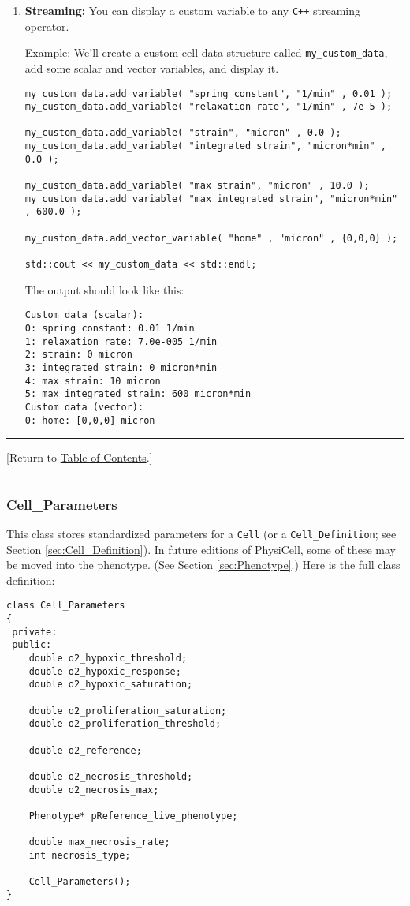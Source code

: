 \documentclass[12pt]{article}
\renewcommand{\v}{\verb}
\newcommand{\TOClink}{\begin{center}\hrule\vskip-5pt\phantom{.}\hfill[Return to \hyperlink{TOC}{Table of Contents}.]\hfill\phantom{.}\vskip3pt\hrule\end{center}}
\begin{document}
\begin{enumerate}
\item 
\textbf{Streaming:} You can display a custom variable to any 
\v|C++| streaming operator. 

\underline{Example:} We'll create a custom cell data structure called \v|my_custom_data|, 
add some scalar and vector variables, and display it. 
\begin{verbatim}
my_custom_data.add_variable( "spring constant", "1/min" , 0.01 ); 
my_custom_data.add_variable( "relaxation rate", "1/min" , 7e-5 ); 

my_custom_data.add_variable( "strain", "micron" , 0.0 ); 
my_custom_data.add_variable( "integrated strain", "micron*min" , 0.0 ); 

my_custom_data.add_variable( "max strain", "micron" , 10.0 ); 
my_custom_data.add_variable( "max integrated strain", "micron*min" , 600.0 ); 

my_custom_data.add_vector_variable( "home" , "micron" , {0,0,0} ); 

std::cout << my_custom_data << std::endl; 
\end{verbatim}

The output should look like this: 

\begin{verbatim}
Custom data (scalar):
0: spring constant: 0.01 1/min
1: relaxation rate: 7.0e-005 1/min
2: strain: 0 micron
3: integrated strain: 0 micron*min
4: max strain: 10 micron
5: max integrated strain: 600 micron*min
Custom data (vector):
0: home: [0,0,0] micron 
\end{verbatim}

\end{enumerate}

\TOClink 

\subsubsection{Cell\_Parameters}
\label{sec:Cell_Parameters} 
This class stores standardized parameters for a \v|Cell| (or a 
\v|Cell_Definition|; see Section \ref{sec:Cell_Definition}). In 
future editions of PhysiCell, some of these may be moved into the 
phenotype. (See Section \ref{sec:Phenotype}.)  Here 
is the full class definition: 

\begin{verbatim}
class Cell_Parameters
{
 private:
 public:
    double o2_hypoxic_threshold;  
    double o2_hypoxic_response;  
    double o2_hypoxic_saturation; 
    
    double o2_proliferation_saturation;  
    double o2_proliferation_threshold;  

    double o2_reference; 
    
    double o2_necrosis_threshold;  
    double o2_necrosis_max;  
    
    Phenotype* pReference_live_phenotype;  

    double max_necrosis_rate; 
    int necrosis_type;  
    
    Cell_Parameters(); 
}
\end{verbatim}
\end{document}

